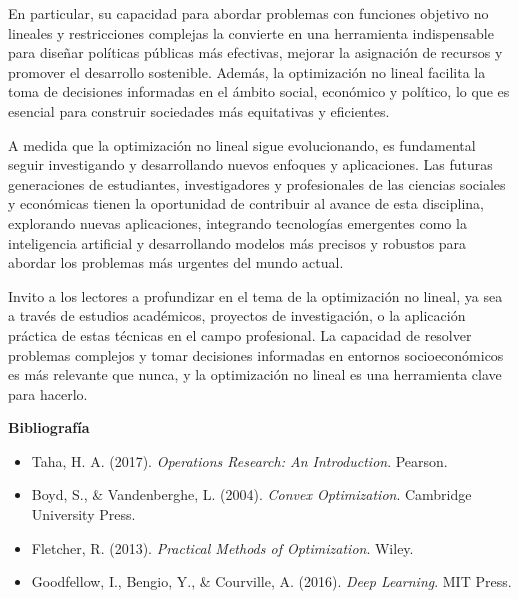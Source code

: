 \begin{flushleft}
	En particular, su capacidad para abordar problemas con funciones objetivo no lineales y restricciones complejas la convierte en una herramienta indispensable para diseñar políticas públicas más efectivas, mejorar la asignación de recursos y promover el desarrollo sostenible. Además, la optimización no lineal facilita la toma de decisiones informadas en el ámbito social, económico y político, lo que es esencial para construir sociedades más equitativas y eficientes.
\end{flushleft}

\begin{flushleft}
	A medida que la optimización no lineal sigue evolucionando, es fundamental seguir investigando y desarrollando nuevos enfoques y aplicaciones. Las futuras generaciones de estudiantes, investigadores y profesionales de las ciencias sociales y económicas tienen la oportunidad de contribuir al avance de esta disciplina, explorando nuevas aplicaciones, integrando tecnologías emergentes como la inteligencia artificial y desarrollando modelos más precisos y robustos para abordar los problemas más urgentes del mundo actual.
\end{flushleft}

\begin{flushleft}
	Invito a los lectores a profundizar en el tema de la optimización no lineal, ya sea a través de estudios académicos, proyectos de investigación, o la aplicación práctica de estas técnicas en el campo profesional. La capacidad de resolver problemas complejos y tomar decisiones informadas en entornos socioeconómicos es más relevante que nunca, y la optimización no lineal es una herramienta clave para hacerlo.
\end{flushleft}
\begin{flushleft}
	\textbf{Bibliografía}
\end{flushleft}

\begin{itemize}
	\item Taha, H. A. (2017). \textit{Operations Research: An Introduction}. Pearson.
	\item Boyd, S., \& Vandenberghe, L. (2004). \textit{Convex Optimization}. Cambridge University Press.
	\item Fletcher, R. (2013). \textit{Practical Methods of Optimization}. Wiley.
	\item Goodfellow, I., Bengio, Y., \& Courville, A. (2016). \textit{Deep Learning}. MIT Press.
\end{itemize}

